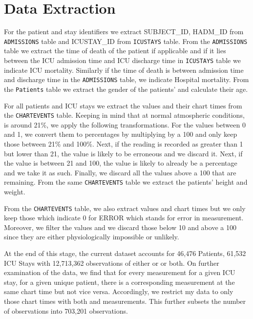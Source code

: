 
\chapter{Data Extraction} %

\label{AppendixB} %


For the patient and stay identifiers we extract SUBJECT\_ID, HADM\_ID from \texttt{ADMISSIONS} table and ICUSTAY\_ID from \texttt{ICUSTAYS} table. From the \texttt{ADMISSIONS} table we extract the time of death of the patient if applicable and if it lies between the ICU admission time and ICU discharge time in \texttt{ICUSTAYS} table we indicate ICU mortality. Similarly if the time of death is between admission time and discharge time in the  \texttt{ADMISSIONS} table, we indicate Hospital mortality. From the \texttt{Patients} table we extract the gender of the patients' and calculate their age.   

For all patients and ICU stays we extract the \Fi values and their chart times from the \texttt{CHARTEVENTS} table. Keeping in mind that at normal atmospheric conditions, \Fi is around 21\%, we apply the following transformations. For the values between 0 and 1, we convert them to percentages by multiplying by a 100 and only keep those between 21\% and 100\%. Next, if the reading is recorded as greater than 1 but lower than 21,  the value is likely to be erroneous and we discard it. Next, if the value is between 21 and 100, the value is likely to already be a percentage and we take it as such. Finally, we discard all the values above a 100 that are remaining. From the same \texttt{CHARTEVENTS} table we extract the patients' height and weight. 

From the \texttt{CHARTEVENTS} table, we also extract \Sp values and chart times but we only keep those which indicate 0 for ERROR which stands for error in measurement.  Moreover, we filter the values and we discard those below 10 and above a 100 since they are either physiologically impossible or unlikely. 

At the end of this stage, the current dataset accounts for 46,476 Patients, 61,532 ICU Stays with 12,713,362 observations of either \Sp or \Fi or both. On further examination of the data, we find that for every \Fi measurement for a given ICU stay, for a given unique patient, there is a corresponding \Sp measurement at the same chart time but not vice versa. Accordingly, we restrict my data to only those chart times with both \Sp and \Fi measurements. This further subsets the number of observations into 703,201 observations.